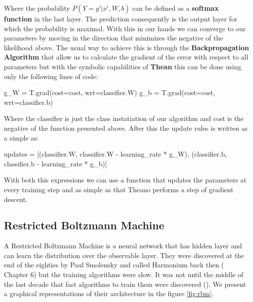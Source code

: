 \documentclass[11pt,a4paper]{article}
\begin{document}
Where the probability $P(Y = y^i | x^i , W, b	)$ can be defined as a \textbf{softmax function} in the last layer. The prediction consequently is the output layer for which the probability is maximal.  With this in our hands we can converge to our parameters by moving in the direction that minimizes the negative of the likelihood above. The usual way to achieve this is through the \textbf{Backpropagation Algorithm} that allow us to calculate the gradient of the error with respect to all parameters but with the symbolic capabilities of \textbf{Thean} this can be done using only the following lines of code:


\begin{python}
g_W = T.grad(cost=cost, wrt=classifier.W)
g_b = T.grad(cost=cost, wrt=classifier.b)
\end{python}

Where the classifier is just the class instatiation of our algorithm and cost is the negative of the function presented above. After this the update rules is written as a simple as:

\begin{center}
\begin{python}
updates = [(classifier.W, classifier.W - learning_rate * g_W),
           (classifier.b, classifier.b - learning_rate * g_b)]
\end{python}
\end{center}

With both this expressions we can use a function that updates the parameters at every training step and as simple as that Theano performs a step of gradient descent. 

\subsection{Restricted Boltzmann Machine}

A Restricted Boltzmann Machine is a neural network that has hidden layer and can learn the distribution over the observable layer. They were discovered at the end of the eighties by Paul Smolensky and called Harmonium back then (\cite{mcclelland1986parallel} Chapter 6) but the training algorithms were slow. It was not until the middle of the last decade that fast algorithms to train them were discovered (\cite{hinton2006reducing}). We present a graphical representations of their architecture in the figure \ref{fig:rbm}.
\end{document}
